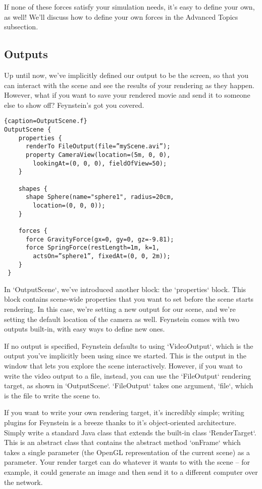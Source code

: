 If none of these forces satisfy your simulation needs, it's easy to
define your own, as well! We'll discuss how to define your own forces
in the Advanced Topics subsection.

\subsection{Outputs}

Up until now, we've implicitly defined our output to be the
screen, so that you can interact with the scene and see the results of
your rendering as they happen. However, what if you want to save your
rendered movie and send it to someone else to show off?  Feynstein's
got you covered.

\begin{lstlisting}{caption=OutputScene.f}
OutputScene {
    properties {
      renderTo FileOutput(file=”myScene.avi”);
      property CameraView(location=(5m, 0, 0), 
        lookingAt=(0, 0, 0), fieldOfView=50);
    }

    shapes {
      shape Sphere(name="sphere1", radius=20cm, 
        location=(0, 0, 0));
    }

    forces {
      force GravityForce(gx=0, gy=0, gz=-9.81);
      force SpringForce(restLength=1m, k=1, 
        actsOn=”sphere1”, fixedAt=(0, 0, 2m));
    }
 }
\end{lstlisting}

In `OutputScene`, we've introduced another block: the `properties`
block. This block contains scene-wide properties that you want to set
before the scene starts rendering. In this case, we're setting a new
output for our scene, and we're setting the default location of the
camera as well. Feynstein comes with two outputs built-in, with easy
ways to define new ones.

If no output is specified, Feynstein defaults to using `VideoOutput`,
which is the output you've implicitly been using since we
started. This is the output in the window that lets you explore the
scene interactively. However, if you want to write the video output to
a file, instead, you can use the `FileOutput` rendering target, as
shown in `OutputScene`. `FileOutput` takes one argument, `file`, which
is the file to write the scene to.

If you want to write your own rendering target, it's incredibly
simple; writing plugins for Feynstein is a breeze thanks to it's
object-oriented architecture. Simply write a standard Java class that
extends the built-in class `RenderTarget`. This is an abstract class
that contains the abstract method `onFrame` which takes a single
parameter (the OpenGL representation of the current scene) as a
parameter. Your render target can do whatever it wants to with the
scene -- for example, it could generate an image and then send it to a
different computer over the network.

